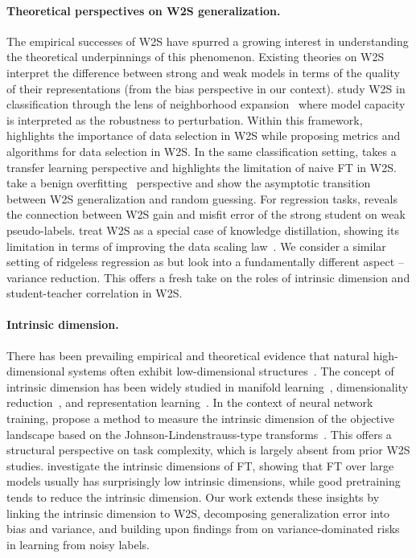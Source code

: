\paragraph{Theoretical perspectives on W2S generalization.} 
The empirical successes of W2S have spurred a growing interest in understanding the theoretical underpinnings of this phenomenon. Existing theories on W2S interpret the difference between strong and weak models in terms of the quality of their representations (from the bias perspective in our context). 
\citet{lang2024theoretical} study W2S in classification through the lens of neighborhood expansion~\citep{wei2020theoretical,cai2021theory} where model capacity is interpreted as the robustness to perturbation.
Within this framework, \citet{shin2024weak} highlights the importance of data selection in W2S while proposing metrics and algorithms for data selection in W2S.
In the same classification setting, \citet{somerstep2024statistical} takes a transfer learning perspective and highlights the limitation of naive FT in W2S.
\citet{wu2024provable} take a benign overfitting~\citep{bartlett2020benign,muthukumar2021classification} perspective and show the asymptotic transition between W2S generalization and random guessing.
For regression tasks, \citet{Charikar2024QuantifyingTG} reveals the connection between W2S gain and misfit error of the strong student on weak pseudo-labels.
\citet{ildiz2024high} treat W2S as a special case of knowledge distillation, showing its limitation in terms of improving the data scaling law~\citep{spigler2020asymptotic,bahri2024explaining}.
We consider a similar setting of ridgeless regression as \citet{ildiz2024high} but look into a fundamentally different aspect -- variance reduction. This offers a fresh take on the roles of intrinsic dimension and student-teacher correlation in W2S. 

\paragraph{Intrinsic dimension.} 
There has been prevailing empirical and theoretical evidence that natural high-dimensional systems often exhibit low-dimensional structures~\citep{udell2019big}.
The concept of intrinsic dimension has been widely studied in manifold learning~\citep{tenenbaum2000global}, dimensionality reduction~\citep{van2008visualizing}, and representation learning~\citep{bengio2013representation}.
In the context of neural network training, \citet{li2018measuring} propose a method to measure the intrinsic dimension of the objective landscape based on the Johnson-Lindenstrauss-type transforms~\citep{johnson1984extensions}. 
This offers a structural perspective on task complexity, which is largely absent from prior W2S studies. 
\citet{aghajanyan2020intrinsic} investigate the intrinsic dimensions of FT, showing that FT over large models usually has surprisingly low intrinsic dimensions, while good pretraining tends to reduce the intrinsic dimension.
Our work extends these insights by linking the intrinsic dimension to W2S, decomposing generalization error into bias and variance, and building upon findings from \citet{yang2020rethinking, amari2020does} on variance-dominated risks in learning from noisy labels.